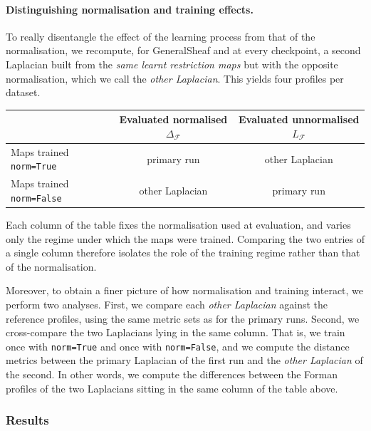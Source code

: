 \paragraph{Distinguishing normalisation and training effects.}

To really disentangle the effect of the learning process from that of the
normalisation, we recompute, for GeneralSheaf and at every
checkpoint, a second Laplacian built from the \emph{same learnt restriction
maps} but with the opposite normalisation, which we call the \emph{other
Laplacian}. This yields four profiles per dataset.
\begin{center}
\renewcommand{\arraystretch}{1.3}
\begin{tabular}{lcc}
\toprule
 & \textbf{Evaluated normalised} $\Delta_{\mathcal{F}}$
 & \textbf{Evaluated unnormalised} $L_{\mathcal{F}}$ \\
\midrule
Maps trained \texttt{norm=True}  & primary run    & other Laplacian \\
Maps trained \texttt{norm=False} & other Laplacian & primary run     \\
\bottomrule
\end{tabular}
\end{center}

Each column of the table fixes the normalisation used at evaluation, and varies
only the regime under which the maps were trained. Comparing the two entries of
a single column therefore isolates the role of the training regime rather than
that of the normalisation.

Moreover, to obtain a finer picture of how normalisation and training interact,
we perform two analyses. First, we compare each \emph{other Laplacian} against
the reference profiles, using the same metric sets as for the primary runs.
Second, we cross-compare the two Laplacians lying in the same column. That is,
we train once with \texttt{norm=True} and once with \texttt{norm=False}, and we
compute the distance metrics between the primary Laplacian of the first run and
the \emph{other Laplacian} of the second. In other words, we compute the
differences between the Forman profiles of the two Laplacians sitting in the
same column of the table above.


\subsubsection{Results}
